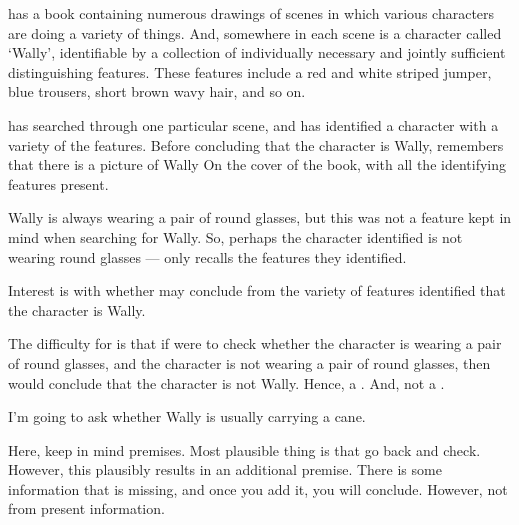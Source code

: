 \begin{note}[Wally]
  \begin{illustration}
    \label{illu:CS:wheres-wally}
     has a book containing numerous drawings of scenes in which various characters are doing a variety of things.
    And, somewhere in each scene is a character called `Wally', identifiable by a collection of individually necessary and jointly sufficient distinguishing features.
    These features include a red and white striped jumper, blue trousers, short brown wavy hair, and so on.

     has searched through one particular scene, and has identified a character with a variety of the features.
    Before concluding that the character is Wally,  remembers that there is a picture of Wally On the cover of the book, with all the identifying features present.

    Wally is always wearing a pair of round glasses, but this was not a feature  kept in mind when searching for Wally.
    So, perhaps the character  identified is not wearing round glasses  ---  only recalls the features they identified.
  \end{illustration}

  Interest is with whether  may conclude from the variety of features identified that the character is Wally.

  The difficulty for  is that if  were to check whether the character is wearing a pair of round glasses, and the character is not wearing a pair of round glasses, then  would conclude that the character is not Wally.
  Hence, a \requ{}.
  And, not a \fc{}.

  I'm going to ask whether Wally is usually carrying a cane.

  Here, keep in mind premises.
  Most plausible thing is that go back and check.
  However, this plausibly results in an additional premise.
  There is some information that is missing, and once you add it, you will conclude.
  However, not from present information.
\end{note}

